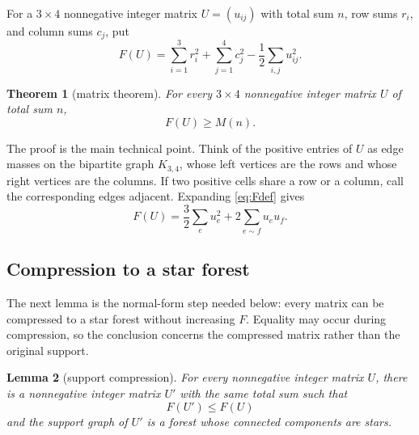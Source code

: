 \documentclass[12pt]{article}
\theoremstyle{plain}
\newtheorem{theorem}{Theorem}
\newtheorem{lemma}[theorem]{Lemma}
\theoremstyle{definition}
\theoremstyle{remark}
\begin{document}
For a \(3\times4\) nonnegative integer matrix \(U=(u_{ij})\) with total sum
\(n\), row sums \(r_i\), and column sums \(c_j\), put
\begin{equation}\label{eq:Fdef}
  F(U)=\sum_{i=1}^3 r_i^2+
        \sum_{j=1}^4 c_j^2-\frac12\sum_{i,j}u_{ij}^2.
\end{equation}

\begin{theorem}[matrix theorem]\label{thm:matrix}
For every \(3\times4\) nonnegative integer matrix \(U\) of total sum \(n\),
\begin{equation}\label{eq:matrix-theorem}
  F(U)\ge M(n).
\end{equation}
\end{theorem}

The proof is the main technical point.  Think of the positive entries of
\(U\) as edge masses on the bipartite graph \(K_{3,4}\), whose left vertices
are the rows and whose right vertices are the columns.  If two positive cells
share a row or a column, call the corresponding edges adjacent.  Expanding
\eqref{eq:Fdef} gives
\begin{equation}\label{eq:F-edge}
  F(U)=\frac32\sum_e u_e^2+2\sum_{e\sim f}u_eu_f.
\end{equation}

\subsection*{Compression to a star forest}

The next lemma is the normal-form step needed below: every matrix can be
compressed to a star forest without increasing \(F\).  Equality may occur during
compression, so the conclusion concerns the compressed matrix rather than the
original support.

\begin{lemma}[support compression]\label{lem:compression}
For every nonnegative integer matrix \(U\), there is a nonnegative integer
matrix \(U'\) with the same total sum such that
\[
  F(U')\le F(U)
\]
and the support graph of \(U'\) is a forest whose connected components are
stars.
\end{lemma}
\end{document}
